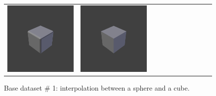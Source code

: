\documentclass[bachelor, nocolorlinks, printoneside]{seuthesis} %
\begin{document}
\begin{Main}
\begin{figure}
\begin{tabular}{c@{}c@{}c@{}c@{}c@{}c@{}c@{}c@{}c@{}c@{}c@{}}
		\includegraphics[width=.09\textwidth,keepaspectratio]{figs/Isometric9.png} &
		\includegraphics[width=.09\textwidth,keepaspectratio]{figs/Isometric10.png} \\    	
	\end{tabular}
	\caption{\small Base dataset \# 1: interpolation between a sphere and a cube.}
    \label{fig:cube-sphere} \vspace{-4mm}
\end{figure}


\end{Main}
\end{document}
